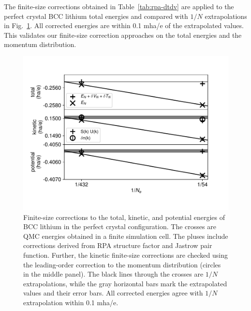 \documentclass[aps,prl,superscriptaddress]{revtex4-1}
\begin{document}
The finite-size corrections obtained in Table~\ref{tab:rpa-dtdv} are applied to the perfect crystal BCC lithium total energies and compared with $1/N$ extrapolations in Fig.~\ref{fig:etot-fsc}. All corrected energies are within 0.1 mha/e of the extrapolated values. This validates our finite-size correction approaches on the total energies and the momentum distribution.

\begin{figure}[h]
\includegraphics[width=0.8\linewidth]{li53_extrap-srat-with-dnk}
\caption{Finite-size corrections to the total, kinetic, and potential energies of BCC lithium in the perfect crystal configuration. The crosses are QMC energies obtained in a finite simulation cell. The pluses include corrections derived from RPA structure factor and Jastrow pair function. Further, the kinetic finite-size corrections are checked using the leading-order correction to the momentum distribution (circles in the middle panel). The black lines through the crosses are $1/N$ extrapolations, while the gray horizontal bars mark the extrapolated values and their error bars. All corrected energies agree with $1/N$ extrapolation within 0.1 mha/e.}
\label{fig:etot-fsc}
\end{figure}



\end{document}
